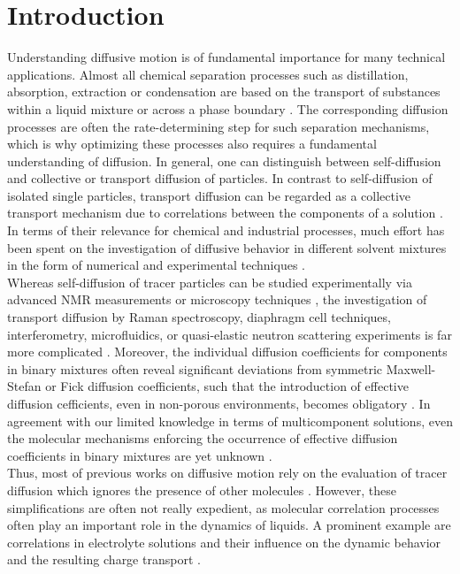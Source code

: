 \documentclass[aip,jcp,reprint]{revtex4-1}
\begin{document}
\section{Introduction}
Understanding diffusive motion is of fundamental importance for many technical applications. Almost all chemical separation processes such as distillation, absorption, extraction or condensation are based on the transport of substances within a liquid mixture or across a phase boundary \cite{seader06a,wankat22a}. The corresponding diffusion processes are often the rate-determining step for such separation mechanisms, which is why optimizing these processes also requires a fundamental understanding of diffusion. 
In general, one can distinguish between self-diffusion  and collective  or transport diffusion of  particles. 
In contrast to self-diffusion of isolated single particles,  transport diffusion can be regarded as a collective transport mechanism due to correlations between the components of a solution \cite{taylor93a,bird04a,newman12a,groot13a,liu13a,guevara16a,janzen17a}. 
In terms of their relevance for chemical and industrial processes, much effort has been spent on the investigation of diffusive behavior in different solvent mixtures \cite{maxwell67a,bird04a,newman12a, groot13a} in the form of numerical and experimental techniques \cite{kincaid83a,derlacki85a,vink85a,trullas93a,vergara01a, keffer05a,rehfeldt07a,krishna08a,krishna09a,rehfeldt10a,liu11a,moggridge12a,liu13a,parez13a,zhu15a,bardow15a,guevara16a,janzen17a}.\\
Whereas self-diffusion of tracer particles can be studied experimentally via advanced NMR measurements or microscopy techniques \cite{kashyap11a},  the investigation of transport diffusion by  Raman
spectroscopy, diaphragm cell techniques, interferometry,
microfluidics, or quasi-elastic neutron scattering experiments is far more complicated \cite{liu13a,taylor93a}. 
Moreover, the individual diffusion coefficients for components in binary mixtures  often reveal significant deviations from symmetric Maxwell-Stefan or Fick diffusion coefficients, such that the introduction of effective diffusion cefficients, even in non-porous environments, becomes obligatory \cite{taylor93a}.  In agreement with our limited knowledge in terms of multicomponent solutions, even the molecular mechanisms enforcing the occurrence of effective diffusion coefficients in binary mixtures are yet unknown \cite{taylor93a}. \\
Thus, most of previous works on diffusive motion rely on the evaluation of tracer diffusion which ignores the presence of other molecules  \cite{liu13a}.  However, these simplifications are often not really expedient, as molecular correlation processes often play an important role in the dynamics of liquids. A prominent example are correlations in electrolyte solutions  and their influence on the dynamic behavior and the resulting charge transport \cite{kashyap11a,smiatek18a}.
\end{document}
